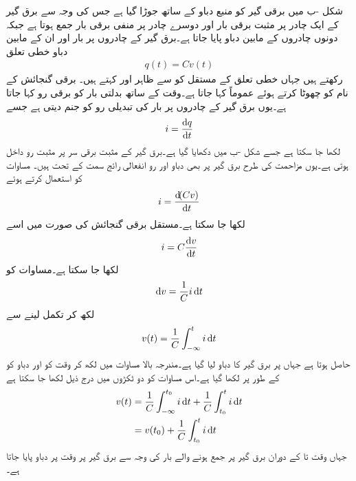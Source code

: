 شکل -ب میں برقی گیر کو  منبع دباو کے ساتھ جوڑا گیا ہے  جس کی وجہ سے برق گیر کے ایک چادر پر مثبت برقی بار  اور دوسرے چادر پر منفی برقی بار  جمع ہوتا ہے جبکہ دونوں چادروں کے مابین دباو  پایا جاتا ہے۔برق گیر کے چادروں پر بار اور ان کے مابین دباو خطی تعلق
\begin{align}\label{مساوات_امالہ_بار_دباو_تعلق}
q(t)=C v(t)
\end{align}
رکھتے ہیں جہاں خطی تعلق کے مستقل کو  سے ظاہر اور   کہتے ہیں۔ برقی گنجائش کے نام کو چھوٹا کرتے ہوئے عموماً  کہا جاتا ہے۔وقت کے ساتھ بدلتی بار کو برقی رو کہا جاتا ہے۔یوں برق گیر کے چادروں پر بار کی تبدیلی رو کو جنم دیتی ہے جسے
\begin{align}
i=\frac{\dif q}{\dif t}
\end{align}
لکھا جا سکتا ہے جسے شکل -ب میں دکھایا گیا ہے۔برق گیر کے مثبت برقی سر پر مثبت رو داخل ہوتی ہے۔یوں مزاحمت کی طرح  برق گیر پر بھی دباو اور رو انفعالی رائج سمت کے تحت ہیں۔ مساوات  کو استعمال کرتے ہوئے 
\begin{align}
i=\frac{\dif (C v)}{\dif t}
\end{align}
لکھا جا سکتا ہے۔مستقل برقی گنجائش کی صورت میں اسے
\begin{align}\label{مساوات_امالہ_بار_دباو_تعلق_ب}
i=C\frac{\dif v}{\dif t}
\end{align}
لکھا جا سکتا ہے۔مساوات  کو
\begin{align*}
\dif v = \frac{1}{C} i \dif t
\end{align*}
لکھ کر تکمل لینے سے
\begin{align}\label{مساوات_امالہ_بار_دباو_تعلق_پ}
v(t)=\frac{1}{C} \int_{-\infty}^{t} i \dif t
\end{align}
حاصل ہوتا ہے جہاں  پر برق گیر کا دباو  لیا گیا ہے۔مندرجہ بالا مساوات میں  لکھ کر وقت کو  اور دباو کو  کے طور پر لکھا گیا ہے۔اس مساوات کو دو ٹکڑوں میں درج ذیل لکھا جا سکتا ہے
\begin{gather}
\begin{aligned}\label{مساوات_امالہ_ابتدائی_دباو_الف}
v(t)&=\frac{1}{C} \int_{-\infty}^{t_0} i \dif t+\frac{1}{C} \int_{t_0}^{t} i \dif t\\
&=v(t_0)+\frac{1}{C} \int_{t_0}^{t} i \dif t
\end{aligned}
\end{gather}
جہاں وقت  تا  کے دوران برق گیر پر جمع ہونے والے بار کی وجہ سے  برق گیر پر وقت  پر دباو  پایا جاتا ہے۔ 

